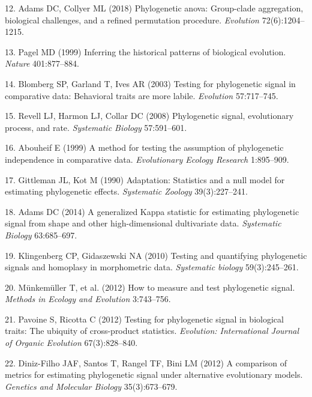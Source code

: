 \documentclass[9pt,twocolumn,twoside,lineno]{pnas-new}
\begin{document}
\leavevmode\hypertarget{ref-AdamsCollyer2018b}{}%
12. Adams DC, Collyer ML (2018) Phylogenetic anova: Group-clade
aggregation, biological challenges, and a refined permutation procedure.
\emph{Evolution} 72(6):1204--1215.

\leavevmode\hypertarget{ref-Pagel1999}{}%
13. Pagel MD (1999) Inferring the historical patterns of biological
evolution. \emph{Nature} 401:877--884.

\leavevmode\hypertarget{ref-Blomberg_et_al2003}{}%
14. Blomberg SP, Garland T, Ives AR (2003) Testing for phylogenetic
signal in comparative data: Behavioral traits are more labile.
\emph{Evolution} 57:717--745.

\leavevmode\hypertarget{ref-Revell_et_al2008}{}%
15. Revell LJ, Harmon LJ, Collar DC (2008) Phylogenetic signal,
evolutionary process, and rate. \emph{Systematic Biology} 57:591--601.

\leavevmode\hypertarget{ref-Abouheif1999}{}%
16. Abouheif E (1999) A method for testing the assumption of
phylogenetic independence in comparative data. \emph{Evolutionary
Ecology Research} 1:895--909.

\leavevmode\hypertarget{ref-Gittleman1990}{}%
17. Gittleman JL, Kot M (1990) Adaptation: Statistics and a null model
for estimating phylogenetic effects. \emph{Systematic Zoology}
39(3):227--241.

\leavevmode\hypertarget{ref-Adams2014a}{}%
18. Adams DC (2014) A generalized Kappa statistic for estimating
phylogenetic signal from shape and other high-dimensional dultivariate
data. \emph{Systematic Biology} 63:685--697.

\leavevmode\hypertarget{ref-Klingenberg2010}{}%
19. Klingenberg CP, Gidaszewski NA (2010) Testing and quantifying
phylogenetic signals and homoplasy in morphometric data.
\emph{Systematic biology} 59(3):245--261.

\leavevmode\hypertarget{ref-Munkemuller_et_al2012}{}%
20. Münkemüller T, et al. (2012) How to measure and test phylogenetic
signal. \emph{Methods in Ecology and Evolution} 3:743--756.

\leavevmode\hypertarget{ref-Pavoine2012}{}%
21. Pavoine S, Ricotta C (2012) Testing for phylogenetic signal in
biological traits: The ubiquity of cross-product statistics.
\emph{Evolution: International Journal of Organic Evolution}
67(3):828--840.

\leavevmode\hypertarget{ref-DinizFilho2012}{}%
22. Diniz-Filho JAF, Santos T, Rangel TF, Bini LM (2012) A comparison of
metrics for estimating phylogenetic signal under alternative
evolutionary models. \emph{Genetics and Molecular Biology}
35(3):673--679.
\end{document}
